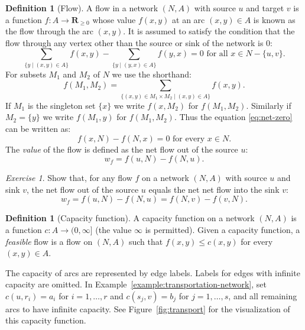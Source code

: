 \documentclass{amsbook}
\newcommand{\RR}{\mathbf R}
\theoremstyle{definition}
\newtheorem{definition}[theorem]{Definition}
\theoremstyle{remark}
\newtheorem{exercise}[theorem]{Exercise}
\begin{document}
\begin{definition}
  [Flow]
  A flow in a network $(N,A)$ with source $u$ and target $v$ is a function $f:A\to \RR_{\geq 0}$ whose value $f(x,y)$ at an arc $(x,y)\in A$ is known as the flow through the arc $(x,y)$.
  It is assumed to satisfy the condition that the flow through any vertex other than the source or sink of the network is $0$:
  \begin{equation}
    \label{eq:net-zero}
    \tag{*}
    \sum_{\{y\mid (x,y)\in A\}}f(x,y) - \sum_{\{y\mid (y,x)\in A\}} f(y,x) = 0 \text{ for all } x\in N-\{u,v\}.
  \end{equation}
  For subsets $M_1$ and $M_2$ of $N$ we use the shorthand:
  \begin{displaymath}
    f(M_1,M_2) = \sum_{\{(x,y)\in M_1\times M_2 \mid (x,y)\in A\}} f(x,y).
  \end{displaymath}
  If $M_1$ is the singleton set $\{x\}$ we write $f(x,M_2)$ for $f(M_1,M_2)$.
  Similarly if $M_2=\{y\}$ we write $f(M_1,y)$ for $f(M_1,M_2)$.
  Thus the equation \eqref{eq:net-zero} can be written as:
  \begin{displaymath}
    f(x,N)-f(N,x)=0 \text{ for every } x\in N.
  \end{displaymath}
  The \emph{value} of the flow is defined as the net flow out of the source $u$:
  \begin{displaymath}
    w_f = f(u,N) - f(N,u).
  \end{displaymath}
\end{definition}
\begin{exercise}
  Show that, for any flow $f$ on a network $(N,A)$ with source $u$ and sink $v$, the net flow out of the source $u$ equals the net net flow into the sink $v$:
  \begin{displaymath}
    w_f=f(u,N)-f(N,u)=f(N,v)-f(v,N).
  \end{displaymath}
\end{exercise}
\begin{definition}
  [Capacity function]
  A capacity function on a network $(N,A)$ is a function $c:A\to (0,\infty]$ (the value $\infty$ is permitted).
  Given a capacity function, a \emph{feasible} flow is a flow on $(N,A)$ such that $f(x,y)\leq c(x,y)$ for every $(x,y)\in A$.
\end{definition}
The capacity of arcs are represented by edge labels.
Labels for edges with infinite capacity are omitted.
In Example~\ref{example:transportation-network}, set $c(u,r_i)=a_i$ for $i=1,\dotsc,r$ and $c(s_j,v)=b_j$ for $j=1,\dotsc,s$, and all remaining arcs to have infinite capacity.
See Figure~\ref{fig:transport} for the visualization of this capacity function.
\end{document}
